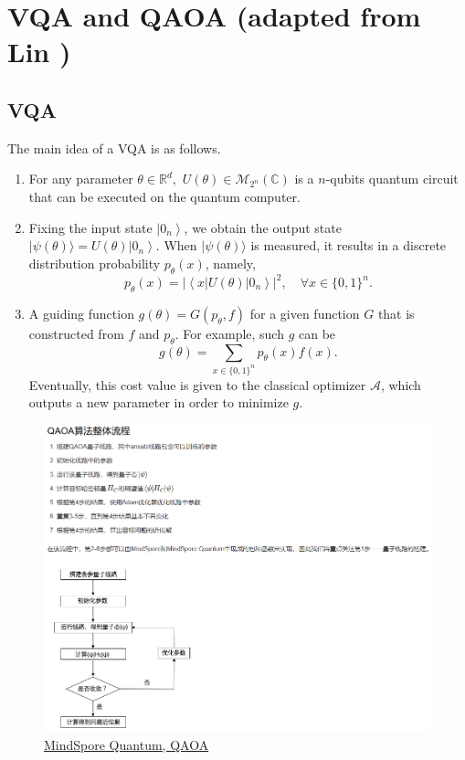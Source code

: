 \documentclass[
        11pt, %
	a4paper, %
]{LegrandOrangeBook}
\begin{document}
\section{VQA and QAOA (adapted from Lin \cite{grange2023introduction})}

\subsection{VQA}

The main idea of a VQA is as follows.

\begin{enumerate}
    \item For any parameter $\theta \in \mathbb{R}^d,$ $U(\theta) \in \mathcal{M}_{2^n}(\mathbb{C})$ is a $n$-qubits quantum circuit that can be executed on the quantum computer.
    \item Fixing the input state $\left|0_n\right\rangle$, we obtain the output state  $|\psi (\theta) \rangle = U(\theta)\left|0_n\right\rangle$. When $|\psi (\theta) \rangle$ is measured, it results in a discrete distribution probability $p_\theta(x)$, namely,
\begin{equation}
    p_\theta(x)=\left|\left\langle x|U(\theta)| 0_n\right\rangle\right|^2, \quad \forall x \in \{0,1\}^{n}.
\end{equation}
    \item A guiding function $g(\theta)=G\left(p_{\theta}, f\right)$ for a given function $G$ that is constructed from $f$ and $p_{\theta}$. For example, such $g$ can be    
\begin{equation}
    g(\theta)=\sum_{x \in\{0,1\}^n} p_\theta(x) f(x).
\end{equation}
    Eventually, this cost value is given to the classical optimizer $\mathcal{A}$, which outputs a new parameter in order to minimize $g$.
\end{enumerate}

\begin{figure}
    \centering
    \includegraphics[width=1\linewidth]{Images/mindspore-qaoa.png}
    \caption{\href{https://www.mindspore.cn/mindquantum/docs/zh-CN/r0.9/case_library/quantum_approximate_optimization_algorithm.html}{MindSpore Quantum, QAOA } }
\end{figure}
\end{document}
